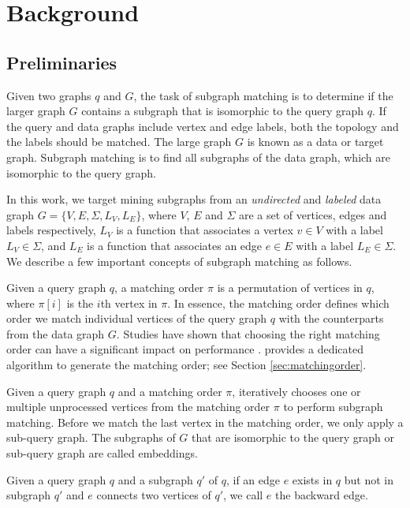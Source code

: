 \section{Background}

\subsection{Preliminaries}
Given two graphs $q$ and $G$, the task of subgraph matching is to determine if the larger graph $G$ contains a subgraph that is isomorphic
to the query graph $q$. If the query and data graphs include vertex and edge labels, both the topology and the labels should be matched. The large graph $G$ is known as a data or target graph.  Subgraph matching is to find all subgraphs  of the data graph, which are isomorphic to the query graph.

In this work, we target mining subgraphs from an \emph{undirected} and \emph{labeled} data graph $G=\{V,E,\Sigma,L_V,L_E\}$, where $V$, $E$
and $\Sigma$ are a set of vertices, edges and labels respectively,  $L_V$ is a function that associates a vertex $v \in V$ with a label
$L_V \in \Sigma$, and $L_E$ is a function that associates an edge $e \in E$ with a label $L_E \in \Sigma$. We describe a few important concepts of subgraph matching as follows.

 Given a query graph $q$, a matching order $\pi$ is a permutation of vertices in $q$, where $\pi[i]$ is the
$i$th vertex in $\pi$. In essence, the matching order defines which order we match individual vertices of the query graph $q$ with the
counterparts from the data graph $G$. Studies have shown that choosing the right matching order can have a significant impact on
performance \cite{bi2016efficient,sun2020subgraph,sun2020rapidmatch,guo2020gpu}.  \SystemName provides a dedicated algorithm to generate
the matching order; see Section \ref {sec:matchingorder}.

 Given a query graph $q$ and a matching order $\pi$, \SystemName iteratively chooses  one or multiple
unprocessed vertices from the matching order $\pi$ to perform subgraph matching. Before we match the last vertex in the matching order, we
only apply a sub-query graph. The subgraphs of $G$ that are isomorphic to the query graph or sub-query graph are called embeddings.

 Given a query graph $q$ and a subgraph $q'$ of $q$, if an edge $e$ exists in $q$ but not in subgraph $q'$ and
$e$ connects two vertices of $q'$, we call $e$ the backward edge.

